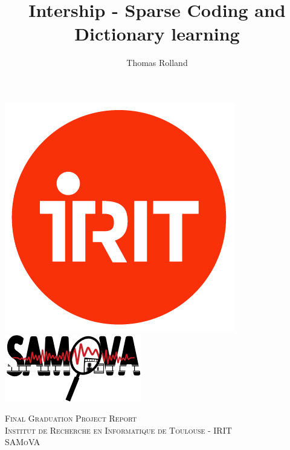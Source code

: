 \documentclass[a4paper,10pt]{report}
\title{Intership - Sparse Coding and Dictionary learning}
\author{Thomas Rolland}
\date{}%
\begin{document}
\begin{titlepage} %
	\newcommand{\HRule}{\rule{\linewidth}{0.5mm}} %
	
	\includegraphics[scale=0.2]{siteon0.png} %
\hfill
 \includegraphics[scale=2]{SAMoVA.png}

	\center %
	
	
	\textsc{\Large Final Graduation Project Report}\\[1.5cm] %
	
	\textsc{\Large Institut de Recherche en Informatique de Toulouse - IRIT}\\[0.5cm] %
	
	\textsc{\large SAMoVA}\\[0.5cm] %
	

\end{titlepage}
\end{document}
